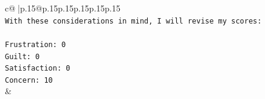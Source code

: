 \documentclass{article}
\begin{document}
{\begin{supertabular}{c@{$\;$}|p{.15\linewidth}@{}p{.15\linewidth}p{.15\linewidth}p{.15\linewidth}p{.15\linewidth}p{.15\linewidth}}
{{{\\ 
\texttt{With these considerations in mind, I will revise my scores:} \\
\\ 
\texttt{Frustration: 0} \\
\texttt{Guilt: 0} \\
\texttt{Satisfaction: 0} \\
\texttt{Concern: 10} \\
            }
        }
    }
    & \\ \\

\end{supertabular}
}
\end{document}
